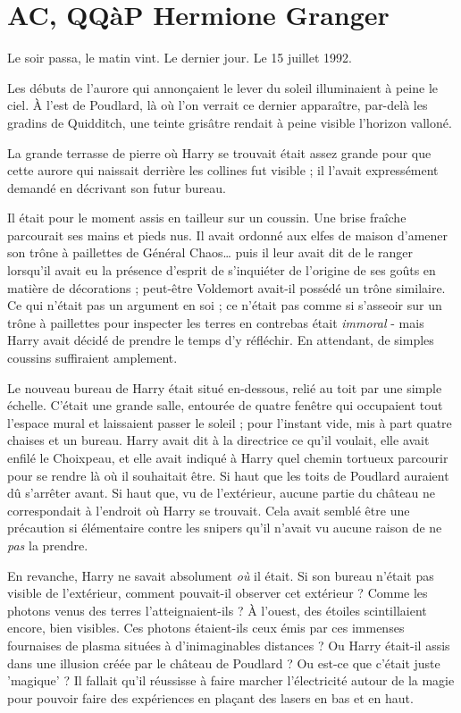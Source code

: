 
\chapter{AC, QQàP   Hermione Granger}

Le soir passa, le matin vint. Le dernier jour. Le 15 juillet 1992.

Les débuts de l'aurore qui annonçaient le lever du soleil illuminaient à peine le ciel. À l'est de Poudlard, là où l'on verrait ce dernier apparaître, par-delà les gradins de Quidditch, une teinte grisâtre rendait à peine visible l'horizon valloné.

La grande terrasse de pierre où Harry se trouvait était assez grande pour que cette aurore qui naissait derrière les collines fut visible ; il l'avait expressément demandé en décrivant son futur bureau.

Il était pour le moment assis en tailleur sur un coussin. Une brise fraîche parcourait ses mains et pieds nus. Il avait ordonné aux elfes de maison d'amener son trône à paillettes de Général Chaos… puis il leur avait dit de le ranger lorsqu'il avait eu la présence d'esprit de s'inquiéter de l'origine de ses goûts en matière de décorations ; peut-être Voldemort avait-il possédé un trône similaire. Ce qui n'était pas un argument en soi ; ce n'était pas comme si s'asseoir sur un trône à paillettes pour inspecter les terres en contrebas était \emph{immoral}  - mais Harry avait décidé de prendre le temps d'y réfléchir. En attendant, de simples coussins suffiraient amplement.

Le nouveau bureau de Harry était situé en-dessous, relié au toit par une simple échelle. C'était une grande salle, entourée de quatre fenêtre qui occupaient tout l'espace mural et laissaient passer le soleil ; pour l'instant vide, mis à part quatre chaises et un bureau. Harry avait dit à la directrice ce qu'il voulait, elle avait enfilé le Choixpeau, et elle avait indiqué à Harry quel chemin tortueux parcourir pour se rendre là où il souhaitait être. Si haut que les toits de Poudlard auraient dû s'arrêter avant. Si haut que, vu de l'extérieur, aucune partie du château ne correspondait à l'endroit où Harry se trouvait. Cela avait semblé être une précaution si élémentaire contre les snipers qu'il n'avait vu aucune raison de ne \emph{pas}  la prendre.

En revanche, Harry ne savait absolument \emph{où}  il était. Si son bureau n'était pas visible de l'extérieur, comment pouvait-il observer cet extérieur ? Comme les photons venus des terres l'atteignaient-ils ? À l'ouest, des étoiles scintillaient encore, bien visibles. Ces photons étaient-ils ceux émis par ces immenses fournaises de plasma situées à d'inimaginables distances ? Ou Harry était-il assis dans une illusion créée par le château de Poudlard ? Ou est-ce que c'était juste 'magique' ? Il fallait qu'il réussisse à faire marcher l'électricité autour de la magie pour pouvoir faire des expériences en plaçant des lasers en bas et en haut.

